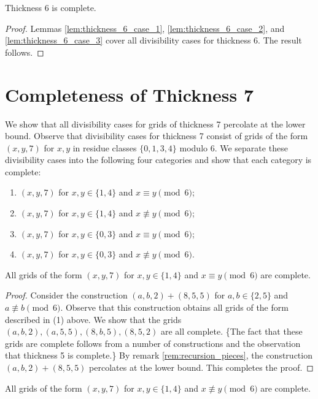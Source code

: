 \begin{lem}
Thickness 6 is complete.
\end{lem}

\begin{proof}
Lemmas \ref{lem:thickness_6_case_1}, \ref{lem:thickness_6_case_2}, and \ref{lem:thickness_6_case_3} cover all divisibility cases for thickness 6. The result follows.
\end{proof}

\section{Completeness of Thickness 7}

We show that all divisibility cases for grids of thickness 7 percolate at the lower bound. Observe that divisibility cases for thickness 7 consist of grids of the form $(x,y,7)$ for $x,y$ in residue classes $\{0,1,3,4\}$ modulo 6. We separate these divisibility cases into the following four categories and show that each category is complete:
\begin{enumerate}
\item $(x,y,7)$ for $x,y \in \{1,4\}$ and $x \equiv y \pmod 6$;
\item $(x,y,7)$ for $x,y \in \{1,4\}$ and $x \not\equiv y \pmod 6$;
\item $(x,y,7)$ for $x,y \in \{0,3\}$ and $x \equiv y \pmod 6$;
\item $(x,y,7)$ for $x,y \in \{0,3\}$ and $x \not\equiv y \pmod 6$.
\end{enumerate}

\begin{lem}
\label{lem:thickness_7_case_1}
All grids of the form $(x,y,7)$ for $x,y \in \{1,4\}$ and $x \equiv y \pmod 6$ are complete.
\end{lem}

\begin{proof}
Consider the construction $(a,b,2) + (8,5,5)$ for $a,b \in \{2,5\}$ and $a \not\equiv b \pmod 6$. Observe that this construction obtains all grids of the form described in (1) above. We show that the grids $(a,b,2), (a,5,5), (8,b,5), (8,5,2)$ are all complete. \{The fact that these grids are complete follows from a number of constructions and the observation that thickness 5 is complete.\} By remark \ref{rem:recursion_pieces}, the construction $(a,b,2) + (8,5,5)$ percolates at the lower bound. This completes the proof. 
\end{proof}

\begin{lem}
\label{lem:thickness_7_case_2}
All grids of the form $(x,y,7)$ for $x,y \in \{1,4\}$ and $x \not\equiv y \pmod 6$ are complete.
\end{lem}

